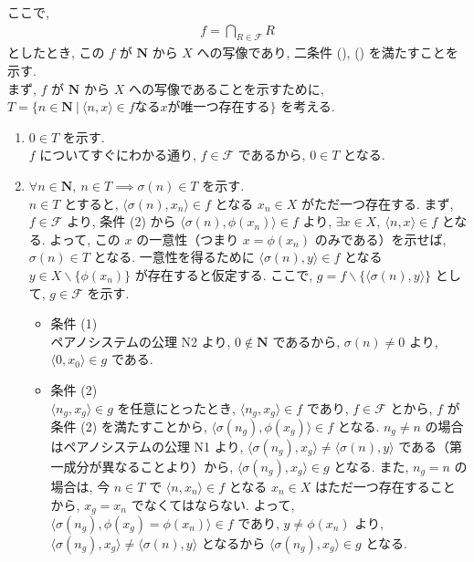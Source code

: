 \begin{nmprob}
{\begin{enumerate}
ここで, 
\begin{align*}
f = \bigcap_{R \in \mathcal{F}} R    
\end{align*}
としたとき, この $f$ が $\bm{N}$ から $X$ への写像であり, 二条件 (), () を満たすことを示す.\\
まず, $f$ が $\bm{N}$ から $X$ への写像であることを示すために, $T = \{ n \in \bm{N}\ |\ \langle n, x\rangle \in f \text{なる} x \text{が唯一つ存在する}\}$ を考える.
\begin{enumerate}
\item $0 \in T$ を示す.\\
$f$ についてすぐにわかる通り, $f \in \mathcal{F}$ であるから, $0 \in T$ となる. 
\item $\forall n \in \bm{N},\ n \in T \implies \sigma (n) \in T$ を示す.\\
$n \in T$ とすると, $\langle \sigma (n), x_n \rangle \in f$ となる $x_n \in X$ がただ一つ存在する. まず, $f \in \mathcal{F}$ より, 条件 (2) から $\langle \sigma (n), \phi (x_n) \rangle \in f$ より,
$\exists x \in X,\ \langle n, x\rangle \in f$ となる. よって, この $x$ の一意性（つまり $x = \phi (x_n)$ のみである）を示せば, $\sigma (n) \in T$ となる.
一意性を得るために $\langle \sigma (n), y \rangle \in f$ となる $y \in X\backslash \{\phi (x_n) \}$ が存在すると仮定する.
ここで, $g = f\backslash \{ \langle \sigma (n), y \rangle\}$ として, $g \in \mathcal{F}$ を示す.
\begin{itemize}
\item 条件 (1)\\
ペアノシステムの公理 N2 より, $0 \notin \bm{N}$ であるから, $\sigma (n) \neq 0$ より, $\langle 0, x_0 \rangle \in g$ である.
\item 条件 (2)\\
$\langle n_g, x_g\rangle \in g$ を任意にとったとき, $\langle n_g, x_g\rangle \in f$ であり, $f \in \mathcal{F}$ とから, $f$ が条件 (2) を満たすことから, $\langle \sigma (n_g), \phi (x_g)\rangle \in f$ となる.
$n_g \neq n$ の場合はペアノシステムの公理 N1 より, $\langle \sigma (n_g), x_g\rangle \neq \langle \sigma (n), y\rangle$ である（第一成分が異なることより）から, $\langle \sigma (n_g), x_g\rangle \in g$ となる.
また, $n_g = n$ の場合は, 今 $n \in T$ で $\langle n, x_n \rangle \in f$ となる $x_n \in X$ はただ一つ存在することから, $x_g = x_n$ でなくてはならない. よって, $\langle \sigma (n_g), \phi (x_g) = \phi (x_n) \rangle \in f$
であり, $y \neq \phi (x_n)$ より, $\langle \sigma (n_g), x_g\rangle \neq \langle \sigma (n), y\rangle$ となるから $\langle \sigma (n_g), x_g\rangle \in g$ となる.

\end{itemize}
\end{enumerate}
\end{enumerate}}
\end{nmprob}
